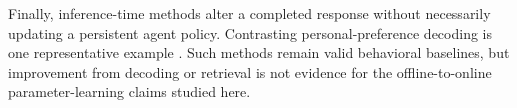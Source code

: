 Finally, inference-time methods alter a completed response without necessarily
updating a persistent agent policy.  Contrasting personal-preference decoding
is one representative example \citep{bu2025cope}.  Such methods remain valid
behavioral baselines, but improvement from decoding or retrieval is not
evidence for the offline-to-online parameter-learning claims studied here.
